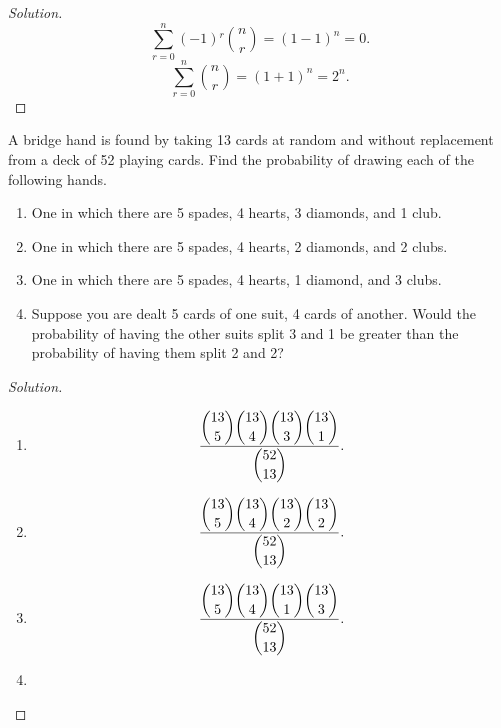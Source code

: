 \documentclass[class=probandstats,crop=false]{standalone}
\begin{document}
\begin{proof}[Solution]
    \[
        \sum^{n}_{r=0}(-1){}^{r}\binom{n}{r} = (1 - 1)^{n} = 0.
    \]
    \[
        \sum^{n}_{r=0}\binom{n}{r} = (1 + 1)^{n} = 2^{n}.
    \]
\end{proof}

\begin{exercise}
    \par A bridge hand is found by taking 13 cards at random and without replacement from a deck of 52 playing cards. Find the probability of drawing each of the following hands.
    \begin{enumerate}[label = \textbf{(\alph*)}]
        \item One in which there are 5 spades, 4 hearts, 3 diamonds, and 1 club.
        \item One in which there are 5 spades, 4 hearts, 2 diamonds, and 2 clubs.
        \item One in which there are 5 spades, 4 hearts, 1 diamond, and 3 clubs.
        \item Suppose you are dealt 5 cards of one suit, 4 cards of another. Would the probability of having the other suits split 3 and 1 be greater than the probability of having them split 2 and 2?
    \end{enumerate}
\end{exercise}

\begin{proof}[Solution]
    \begin{enumerate}[label = \textbf{(\alph*)}]
        \item
              \[
                  \dfrac{
                      \dbinom{13}{5}
                      \dbinom{13}{4}
                      \dbinom{13}{3}
                      \dbinom{13}{1}
                  }{\dbinom{52}{13}}.
              \]
        \item
              \[
                  \dfrac{
                      \dbinom{13}{5}
                      \dbinom{13}{4}
                      \dbinom{13}{2}
                      \dbinom{13}{2}
                  }{\dbinom{52}{13}}.
              \]
        \item
              \[
                  \dfrac{
                      \dbinom{13}{5}
                      \dbinom{13}{4}
                      \dbinom{13}{1}
                      \dbinom{13}{3}
                  }{\dbinom{52}{13}}.
              \]
        \item \idontknowcards
    \end{enumerate}
\end{proof}
\end{document}
